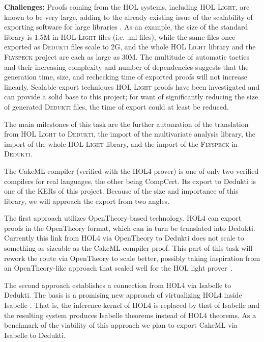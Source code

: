 \begin{workpackage}[id=libraries,wphases=0-48,type=RTD,
  short=Libraries,%
  title=Libraries,
  lead=Inr,
  InrRM=10,
  TumRM=39]
\begin{tasklist}
\begin{task}[id=flyspeck,title=The Flyspeck library]
\textbf{Challenges:}
Proofs coming from the HOL systems, including \textsc{HOL Light}, are known to
be very large, adding to the already existing issue of the scalability of
exporting software for large libraries
\cite{DBLP:conf/tphol/Wong95,DBLP:conf/cade/ObuaS06,DBLP:conf/itp/KellerW10,
DBLP:conf/cade/Kumar13}. As an example, the size of the standard library is
1.5M in \textsc{HOL Light} files (i.e. .ml files), while the same files once
exported as \textsc{Dedukti} files scale to 2G, and the whole
\textsc{HOL Light} library and the \textsc{Flyspeck} project are each as
large as 30M. The multitude of automatic tactics and their increasing
complexity and number of dependencies suggests that the generation time, size,
and rechecking time of exported proofs will not increase linearly. Scalable
export techniques \textsc{HOL Light} proofs have been investigated
\cite{KaliszykK13} and can provide a solid base to
this project; for want of significantly reducing the size of generated
\textsc{Dedukti} files, the time of export could at least be reduced.

The main milestones of this task are the further automation of the translation
from \textsc{HOL Light} to \textsc{Dedukti}, the import of the multivariate
analysis library, the import of the whole \textsc{HOL Light} library, and the
import of the \textsc{Flyspeck} in \textsc{Dedukti}.
\end{task}

\begin{task}[id=cakeml,title=The CakeML compiler library]
  The CakeML
 compiler \cite{KumarMNO14} (verified with the HOL4 prover) is one of only two verified compilers for real
 languages, the other being CompCert. Its export to Dedukti is one of
 the KERs of this project. Because of the size and importance of this
 library, we will approach the export from two angles.

 The first approach utilizes OpenTheory-based technology. HOL4 can
 export proofs in the OpenTheory format, which can in turn be
 translated into Dedukti. Currently this link from HOL4 via OpenTheory
 to Dedukti does not scale to something as sizeable as the CakeML
 compiler proof. This part of this task will rework the route via
 OpenTheory to scale better, possibly taking inspiration from an
 OpenTheory-like approach that scaled well for the HOL light
 prover~\cite{KaliszykK13}.

 The second approach establishes a connection from HOL4 via Isabelle
 to Dedukti. The basis is a promising new approach of virtualizing
 HOL4 inside Isabelle \cite{ImmlerRW19}. That is, the inference kernel
 of HOL4 is replaced by that of Isabelle and the resulting system
 produces Isabelle theorems instead of HOL4 theorems. As a benchmark
 of the viability of this approach we plan to export CakeML via
 Isabelle to Dedukti.
\end{task}


\end{tasklist}
\end{workpackage}
